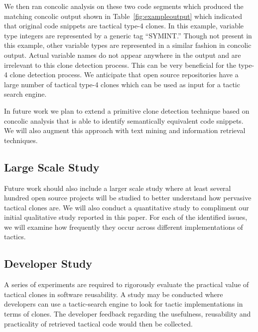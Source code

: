 We then ran concolic analysis on these two code segments which produced the matching concolic output shown in Table~\ref{fig:exampleoutput} which indicated that original code snippets are tactical type-4 clones. In this example, variable type integers are represented by a generic tag ``SYMINT.'' Though not present in this example, other variable types are represented in a similar fashion in concolic output. Actual variable names do not appear anywhere in the output and are irrelevant to this clone detection process. This can be very beneficial for the type-4 clone detection process. We anticipate that open source repositories have a large number of tactical type-4 clones which can be used as input for a tactic search engine.

In future work we plan to extend a primitive clone detection technique based on concolic analysis that is able to identify semantically equivalent code snippets. We will also augment this approach with text mining and information retrieval techniques.

\subsection{Large Scale Study}
Future work should also include a larger scale study where at least several hundred open source projects will be studied to better understand how pervasive tactical clones are. We will also conduct a quantitative study to compliment our initial qualitative study reported in this paper. For each of the identified issues, we will examine how frequently they occur across different implementations of tactics.


\subsection{Developer Study}
A series of experiments are required to rigorously evaluate the practical value of tactical clones in software reusability. A study may be conducted where developers can use a tactic-search engine to look for tactic implementations in terms of clones. The developer feedback regarding the usefulness, reusability and practicality of retrieved tactical code would then be collected.

 



